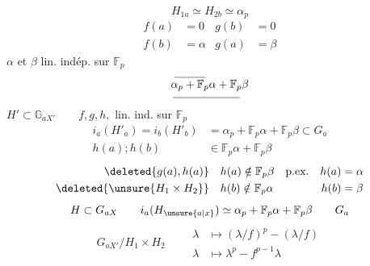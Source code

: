 \[
 H_{1a}\simeq H_{2b}\simeq\alpha_p
\]
\[
 \begin{aligned}
 f(a)&=0&g(b)&=0\\
 f(b)&=\alpha&g(a)&=\beta
 \end{aligned}
\]
$\alpha$ et $\beta$ lin. indép. sur $\mathbb F_p$
\[
 \underset{\rule{6.0em}{.35pt}}{\overset{\rule{2.8em}{.35pt}}{\alpha_p+\mathbb F_p}\alpha+\mathbb F_p}\beta
\]
$H'\subset\mathbb G_{aX'}\qquad f,g,h,$ lin.  ind. sur $\mathbb F_p$
\[
 \begin{aligned}
 i_a(H'_a)=i_b(H'_b)&=\alpha_p+\mathbb F_p\alpha+\mathbb F_p\beta\subset G_a\\
 h(a)\mathbin{;}h(b)&\in\mathbb F_p\alpha+\mathbb F_p\beta
 \end{aligned}
\]
\[
 \begin{aligned}
 \deleted{g(a),h(a)}\quad &h(a)\notin\mathbb F_p\beta
       &\text{p.ex.}\quad h(a)&=\alpha\\
 \deleted{\unsure{H_1\times H_2}}\quad &h(b)\notin\mathbb F_p\alpha
       & h(b)&=\beta
 \end{aligned}
\]
\[
 H\subset G_{aX}\qquad i_a(H_{\unsure{a|x}})\simeq\alpha_p+\mathbb F_p\alpha+\mathbb F_p\beta
 \qquad G_a
\]
\[
 G_{aX'} / H_1\times H_2\qquad
 \begin{aligned}
 \lambda&\longmapsto(\lambda/f)^p-(\lambda/f)\\
 \lambda&\longmapsto\lambda^p-f^{p-1}\lambda
 \end{aligned}
\]
